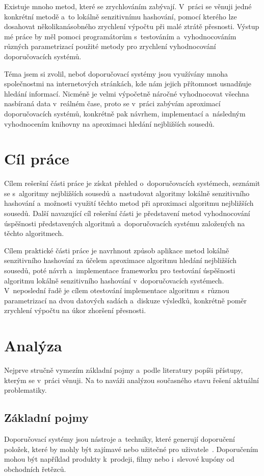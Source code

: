 \documentclass[11pt]{article}
\begin{document}
Existuje mnoho metod, které se zrychlováním zabývají. V~práci se věnuji
jedné konkrétní metodě a~to lokálně senzitivnímu hashování, pomocí kterého lze dosahovat několikanásobného zrychlení výpočtu při malé ztrátě přesnosti. Výstup mé práce by měl pomoci programátorům s~testováním a~vyhodnocováním různých parametrizací použité metody pro zrychlení vyhodnocování doporučovacích systémů.

Téma jsem si zvolil, neboť doporučovací systémy jsou využívány mnoha
společnostmi na internetových stránkách, kde nám jejich přítomnost usnadňuje
hledání informací. Nicméně je velmi výpočetně náročné vyhodnocovat
všechna nasbíraná data v~reálném čase, proto se v~práci zabývám aproximací doporučovacích systémů, konkrétně pak návrhem, implementací a~následným vyhodnocením knihovny na aproximaci hledání nejbližších sousedů.

\section{Cíl práce}
Cílem rešeršní části práce je získat přehled o~doporučovacích systémech, seznámit se s~algoritmy nejbližších sousedů a~nastudovat algoritmy lokálně senzitivního hashování a~možnosti využití těchto metod při aproximaci algoritmu nejbližších sousedů. Další navazující cíl rešeršní části je představení metod vyhodnocování úspěšnosti představených algoritmů a~doporučovacích systému založených na těchto algoritmech.

Cílem praktické části práce je navrhnout způsob aplikace metod lokálně
senzitivního hashování za účelem aproximace algoritmu hledání nejbližších sousedů, poté návrh a~implementace frameworku pro testování úspěšnosti algoritmu lokálně senzitivního hashování v~doporučovacích systémech. V~neposlední řadě je cílem otestování implementace algoritmu s~různou parametrizací na dvou datových sadách a~diskuze výsledků, konkrétně poměr zrychlení výpočtu na úkor zhoršení přesnosti.

\section{Analýza}
Nejprve stručně vymezím základní pojmy a~podle literatury popíši přístupy, kterým se v~práci věnuji. Na to naváži analýzou současného stavu řešení aktuální problematiky.

\subsection{Základní pojmy}
Doporučovací systémy jsou nástroje a~techniky, které generují doporučení položek, které by mohly být zajímavé nebo užitečné pro uživatele~\cite[pg.1]{RECHAndBook}. Doporučením mohou být například produkty k~prodeji, filmy nebo i~slevové kupóny od obchodních řetězců.
\end{document}
